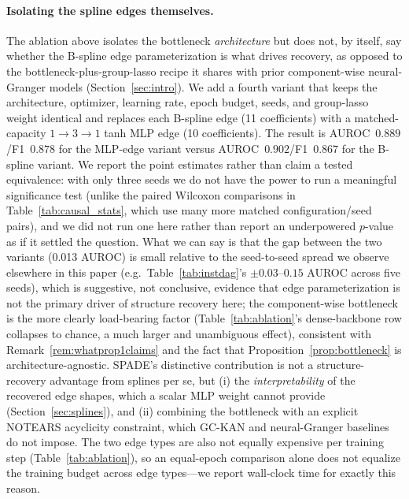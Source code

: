 \paragraph{Isolating the spline edges themselves.} The ablation
above isolates the bottleneck \emph{architecture} but does not, by itself, say
whether the B-spline edge parameterization is what drives recovery, as opposed
to the bottleneck-plus-group-lasso recipe it shares with prior component-wise
neural-Granger models (Section~\ref{sec:intro}). We add a fourth variant that
keeps the architecture, optimizer, learning rate, epoch budget, seeds, and
group-lasso weight identical and replaces each B-spline edge (11 coefficients)
with a matched-capacity $1\!\to\!3\!\to\!1$ tanh MLP edge (10 coefficients).
The result is AUROC~$0.889$/F1~$0.878$ for the MLP-edge variant versus
AUROC~$0.902$/F1~$0.867$ for the B-spline variant. We report the point
estimates rather than claim a tested equivalence: with only three seeds we
do not have the power to run a meaningful significance test (unlike the
paired Wilcoxon comparisons in Table~\ref{tab:causal_stats}, which use many
more matched configuration/seed pairs), and we did not run one here rather
than report an underpowered $p$-value as if it settled the question. What
we can say is that the gap between the two variants (0.013 AUROC) is small
relative to the seed-to-seed spread we observe elsewhere in this paper
(e.g.\ Table~\ref{tab:instdag}'s $\pm0.03$--$0.15$ AUROC across five seeds),
which is suggestive, not conclusive, evidence that edge parameterization is
not the primary driver of structure recovery here; the component-wise
bottleneck is the more clearly load-bearing factor
(Table~\ref{tab:ablation}'s dense-backbone row collapses to chance, a much
larger and unambiguous effect), consistent with
Remark~\ref{rem:whatprop1claims} and the fact that
Proposition~\ref{prop:bottleneck} is architecture-agnostic.
SPADE's distinctive contribution is not a structure-recovery advantage from splines
per se, but (i) the \emph{interpretability} of the recovered edge shapes,
which a scalar MLP weight cannot provide (Section~\ref{sec:splines}), and (ii)
combining the bottleneck with an explicit NOTEARS acyclicity constraint, which
GC-KAN and neural-Granger baselines do not impose. The two edge types are also
not equally expensive per training step (Table~\ref{tab:ablation}), so an
equal-epoch comparison alone does not equalize the training budget across edge
types---we report wall-clock time for exactly this reason.

\begin{table}[t]
\centering
\caption{Ablation of SPADE on non-linear synthetic data (mean over 3 seeds; no
formal significance test at this seed count). The information bottleneck is
decisive (the dense-backbone variant collapses to chance); the matched-capacity
MLP-edge variant's point estimate is close to the B-spline variant's, which we
report as suggestive rather than as a tested equivalence.
Fit time is per seed, same 150-epoch budget; ``--'' marks variants whose
wall-clock was not measured.}
\label{tab:ablation}
\end{table}

